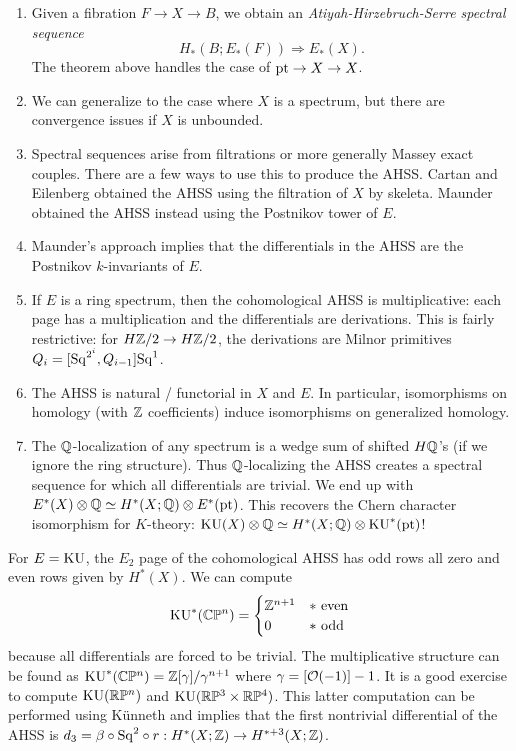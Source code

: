 \documentclass{article}
\begin{document}
\begin{rmk}
	\begin{enumerate}
		\item Given a fibration $F \to X \to B$, we obtain an \emph{Atiyah-Hirzebruch-Serre spectral sequence}
			\[
				H_*(B; E_*(F)) \Rightarrow E_*(X).
			\]
			The theorem above handles the case of $\mathrm{pt} \to X \to X$.
		\item We can generalize to the case where $X$ is a spectrum, but there are convergence issues if $X$ is unbounded.
		\item Spectral sequences arise from filtrations or more generally Massey exact couples.
			There are a few ways to use this to produce the AHSS.
			Cartan and Eilenberg obtained the AHSS using the filtration of $X$ by skeleta.
			Maunder obtained the AHSS instead using the Postnikov tower of $E$.
		\item Maunder's approach implies that the differentials in the AHSS are the Postnikov $k$-invariants of $E$.
		\item If $E$ is a ring spectrum, then the cohomological AHSS is multiplicative: each page has a multiplication and the differentials are derivations.
			This is fairly restrictive: for $H\mathbb{Z}/2 \to H\mathbb{Z}/2$, the derivations are Milnor primitives $Q_i = [\mathrm{Sq}^{2^i}, Q_{i-1}] \mathrm{Sq}^1$.
		\item The AHSS is natural / functorial in $X$ and $E$.
			In particular, isomorphisms on homology (with $\mathbb{Z}$ coefficients) induce isomorphisms on generalized homology.
		\item The $\mathbb{Q}$-localization of any spectrum is a wedge sum of shifted $H\mathbb{Q}$'s (if we ignore the ring structure).
			Thus $\mathbb{Q}$-localizing the AHSS creates a spectral sequence for which all differentials are trivial.
			We end up with $E^*(X) \otimes \mathbb{Q} \simeq H^*(X; \mathbb{Q}) \otimes E^*(\mathrm{pt})$.
			This recovers the Chern character isomorphism for $K$-theory: $\mathrm{KU}(X) \otimes \mathbb{Q} \simeq H^*(X; \mathbb{Q}) \otimes \mathrm{KU}^*(\mathrm{pt})$!
	\end{enumerate}
\end{rmk}

\begin{ex}
	For $E = \mathrm{KU}$, the $E_2$ page of the cohomological AHSS has odd rows all zero and even rows given by $H^*(X)$.
	We can compute
	\[
		\mathrm{KU}^*(\mathbb{C}\mathbb{P}^n) = \begin{cases}
			\mathbb{Z}^{n+1} & * \textrm{ even} \\
			0 & * \textrm{ odd}
		\end{cases}
	\]
	because all differentials are forced to be trivial.
	The multiplicative structure can be found as $\mathrm{KU}^*(\mathbb{C}\mathbb{P}^n) = \mathbb{Z}[\gamma] / \gamma^{n+1}$ where $\gamma = [\mathcal{O}(-1)] - 1$.
	It is a good exercise to compute $\mathrm{KU}(\mathbb{R}\mathbb{P}^n)$ and $\mathrm{KU}(\mathbb{R}\mathbb{P}^3 \times \mathbb{R}\mathbb{P}^4)$.
	This latter computation can be performed using K\"unneth and implies that the first nontrivial differential of the AHSS is $d_3 = \beta \circ \mathrm{Sq}^2 \circ r: H^*(X; \mathbb{Z}) \to H^{*+3}(X; \mathbb{Z})$.
\end{ex}
\end{document}

